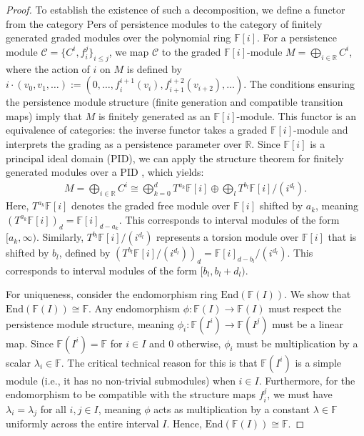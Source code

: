 \begin{proof}
To establish the existence of such a decomposition, we define a functor from the category $\mathrm{Pers}$ of persistence modules to the category of finitely generated graded modules over the polynomial ring $\mathbb{F}[i]$. For a persistence module $\mathcal{C} = \{C^i, f_{i}^j\}_{i \leq j}$, we map $\mathcal{C}$ to the graded $\mathbb{F}[i]$-module $M = \bigoplus_{i \in \mathbb{R}} C^i$, where the action of $i$ on $M$ is defined by $i \cdot (v_0, v_1, \ldots) := (0, \ldots, f_i^{i+1}(v_i), f_{i+1}^{i+2}(v_{i+2}), \ldots)$. The conditions ensuring the persistence module structure (finite generation and compatible transition maps) imply that $M$ is finitely generated as an $\mathbb{F}[i]$-module. This functor is an equivalence of categories: the inverse functor takes a graded $\mathbb{F}[i]$-module and interprets the grading as a persistence parameter over $\mathbb{R}$. Since $\mathbb{F}[i]$ is a principal ideal domain (PID), we can apply the structure theorem for finitely generated modules over a PID \cite[\S 2.1]{zomorodian2004computing}, which yields:
\begin{align}
	M = \bigoplus_{i \in \mathbb{R}} C^i \cong \bigoplus_{k=0}^d T^{a_k} \mathbb{F}[i] \oplus \bigoplus_l T^{b_l} \mathbb{F}[i] / (i^{d_l}).
\end{align}
Here, \( T^{a_k} \mathbb{F}[i] \) denotes the graded free module over \( \mathbb{F}[i] \) shifted by \( a_k \), meaning \( (T^{a_k} \mathbb{F}[i])_d = \mathbb{F}[i]_{d - a_k} \). This corresponds to interval modules of the form \( [a_k, \infty) \). Similarly, \( T^{b_l} \mathbb{F}[i] / (i^{d_l}) \) represents a torsion module over \( \mathbb{F}[i] \) that is shifted by \( b_l \), defined by \( (T^{b_l} \mathbb{F}[i] / (i^{d_l}))_d = \mathbb{F}[i]_{d - b_l} / (i^{d_l}) \). This corresponds to interval modules of the form \( [b_l, b_l + d_l) \). 

For uniqueness, consider the endomorphism ring $\text{End}(\mathbb{F}(I))$. We show that $\text{End}(\mathbb{F}(I)) \cong \mathbb{F}$. Any endomorphism $\phi: \mathbb{F}(I) \to \mathbb{F}(I)$ must respect the persistence module structure, meaning $\phi_i: \mathbb{F}(I^i) \to \mathbb{F}(I^j)$ must be a linear map. Since $\mathbb{F}(I^i) = \mathbb{F}$ for $i \in I$ and $0$ otherwise, $\phi_i$ must be multiplication by a scalar $\lambda_i \in \mathbb{F}$. The critical technical reason for this is that $\mathbb{F}(I^i)$ is a simple module (i.e., it has no non-trivial submodules) when $i \in I$. Furthermore, for the endomorphism to be compatible with the structure maps $f_{i}^j$, we must have $\lambda_i = \lambda_j$ for all $i, j \in I$, meaning $\phi$ acts as multiplication by a constant $\lambda \in \mathbb{F}$ uniformly across the entire interval $I$. Hence, $\text{End}(\mathbb{F}(I)) \cong \mathbb{F}$.


\end{proof}
